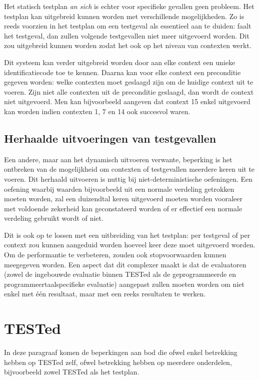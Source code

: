 Het statisch testplan \emph{an sich} is echter voor specifieke gevallen geen probleem.
Het testplan kan uitgebreid kunnen worden met verschillende mogelijkheden.
Zo is reeds voorzien in het testplan om een testgeval als essentieel aan te duiden: faalt het testgeval, dan zullen volgende testgevallen niet meer uitgevoerd worden.
Dit zou uitgebreid kunnen worden zodat het ook op het niveau van contexten werkt.

Dit systeem kan verder uitgebreid worden door aan elke context een unieke identificatiecode toe te kennen.
Daarna kan voor elke context een preconditie gegeven worden: welke contexten moet geslaagd zijn om de huidige context uit te voeren.
Zijn niet alle contexten uit de preconditie geslaagd, dan wordt de context niet uitgevoerd.
Men kan bijvoorbeeld aangeven dat context 15 enkel uitgevoerd kan worden indien contexten 1, 7 en 14 ook succesvol waren.

\subsection{Herhaalde uitvoeringen van testgevallen}\label{subsec:herhaalde-uitvoeringen-van-testgevallen}

Een andere, maar aan het dynamisch uitvoeren verwante, beperking is het ontbreken van de mogelijkheid om contexten of testgevallen meerdere keren uit te voeren.
Dit herhaald uitvoeren is nuttig bij niet-deterministische oefeningen.
Een oefening waarbij waarden bijvoorbeeld uit een normale verdeling getrokken moeten worden, zal een duizendtal keren uitgevoerd moeten worden vooraleer met voldoende zekerheid kan geconstateerd worden of er effectief een normale verdeling gebruikt wordt of niet.

Dit is ook op te lossen met een uitbreiding van het testplan: per testgeval of per context zou kunnen aangeduid worden hoeveel keer deze moet uitgevoerd worden.
Om de performantie te verbeteren, zouden ook stopvoorwaarden kunnen meegegeven worden.
Een aspect dat dit complexer maakt is dat de evaluatoren (zowel de ingebouwde evaluatie binnen TESTed als de geprogrammeerde en programmeertaalspecifieke evaluatie) aangepast zullen moeten worden om niet enkel met één resultaat, maar met een reeks resultaten te werken.

\section{TESTed}\label{sec:beperkingen-tested}

In deze paragraaf komen de beperkingen aan bod die ofwel enkel betrekking hebben op TESTed zelf, ofwel betrekking hebben op meerdere onderdelen, bijvoorbeeld zowel TESTed als het testplan.

